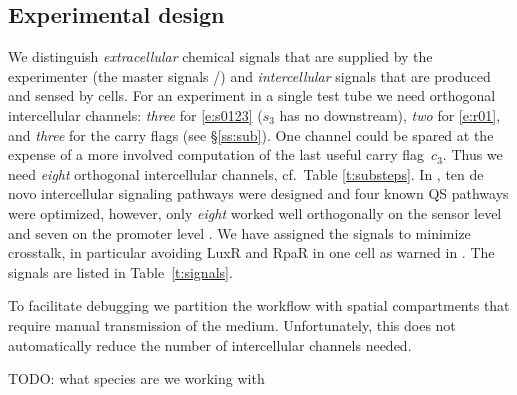 \documentclass[12pt,notitlepage]{article}
\newcommand{\TODO}[1]{\textrm{\color{red}TODO: #1}}
\newcommand{\ra}[1]{{\color{Blue}#1}}
\begin{document}












\subsection{Experimental design} \label{ss:experiment}

We distinguish
\emph{extracellular} chemical signals 
that are supplied by the experimenter
(the master signals /)
and
\emph{intercellular} signals
that are produced and sensed by cells.
%
%
%
For an experiment in a single test tube 
we need
orthogonal intercellular channels:
\emph{three} for \eqref{e:s0123}
($s_3$ has no downstream),
\emph{two} for \eqref{e:r01},
and
\emph{three} for the carry flags
(see \S\ref{ss:sub}).
%
One channel could be spared 
at the expense
of a more involved computation of 
the last useful carry flag~$c_3$.
%
Thus we need \emph{eight} orthogonal intercellular channels,
cf.~Table \ref{t:substeps}.
%
In \cite{DuETAL2020},
ten de novo intercellular signaling pathways
were designed
and
four known QS pathways
were optimized,
however,
only \emph{eight} worked well orthogonally
on the sensor level 
and 
seven on the promoter level
\cite[\href{https://www.nature.com/articles/s41467-020-17993-w/figures/3}{Fig.~3c/g}]{DuETAL2020}.
%
We have assigned the signals
to minimize crosstalk,
in particular 
avoiding LuxR and RpaR in one cell
as warned in \cite[p.6]{DuETAL2020}.
%
The signals are listed in
Table~\ref{t:signals}.
%
%
%




%

\ra{
To facilitate debugging
we partition the workflow
with spatial compartments
that require manual transmission of 
the medium.
%
%
Unfortunately, this does not automatically reduce
the number of intercellular channels needed.
}


\TODO{what species are we working with}
\end{document}
